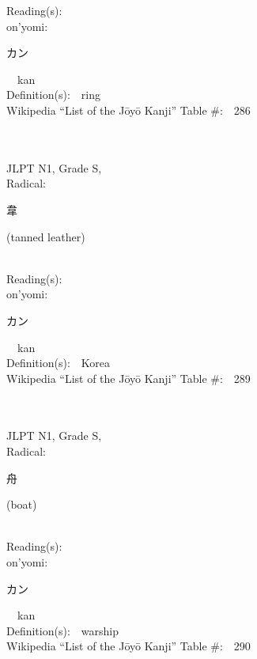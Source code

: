 \begin{multicols}{2}
Reading(s):\ \ \\
{\hspace*{1em}}on'yomi:\ \ \\
{\hspace*{2em}}{\begin{CJK}{UTF8}{min} カン \end{CJK}}\ \ kan\ \ \\
Definition(s):\ \ ring \\
Wikipedia ``List of the J\=oy\=o Kanji'' Table \#:\ \ 286 \\
\ \ \\
{\fontsize{34pt}{40pt}  }\ \ \\
{JLPT N1, Grade S, \\Radical:\ \ {\begin{CJK}{UTF8}{min} 韋 \end{CJK}} (tanned leather) } \\
Reading(s):\ \ \\
{\hspace*{1em}}on'yomi:\ \ \\
{\hspace*{2em}}{\begin{CJK}{UTF8}{min} カン \end{CJK}}\ \ kan\ \ \\
Definition(s):\ \ Korea \\
Wikipedia ``List of the J\=oy\=o Kanji'' Table \#:\ \ 289 \\
\ \ \\
{\fontsize{34pt}{40pt}  }\ \ \\
{JLPT N1, Grade S, \\Radical:\ \ {\begin{CJK}{UTF8}{min} 舟 \end{CJK}} (boat) } \\
Reading(s):\ \ \\
{\hspace*{1em}}on'yomi:\ \ \\
{\hspace*{2em}}{\begin{CJK}{UTF8}{min} カン \end{CJK}}\ \ kan\ \ \\
Definition(s):\ \ warship \\
Wikipedia ``List of the J\=oy\=o Kanji'' Table \#:\ \ 290 \\

\end{multicols}
